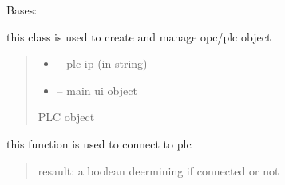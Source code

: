 \documentclass[letterpaper,10pt,english]{sphinxmanual}
\begin{document}
\begin{savenotes}\begin{fulllineitems}
\label{\detokenize{setting/backend/plc_managment:oxin.backend.plc_managment.management}}
\pysigstartsignatures
{}
\pysigstopsignatures
\sphinxAtStartPar
Bases: 

\sphinxAtStartPar
this class is used to create and manage opc/plc object
\begin{quote}\begin{description}
\begin{itemize}
\item {} 
\sphinxAtStartPar
{} – plc ip (in string)

\item {} 
\sphinxAtStartPar
{} – main ui object

\end{itemize}

\sphinxAtStartPar
PLC object

\end{description}\end{quote}

\begin{savenotes}\begin{fulllineitems}
\label{\detokenize{setting/backend/plc_managment:oxin.backend.plc_managment.management.connection}}
\pysigstartsignatures
{}
\pysigstopsignatures
\sphinxAtStartPar
this function is used to connect to plc
\begin{quote}\begin{description}
\sphinxAtStartPar
resault: a boolean deermining if connected or not

\end{description}\end{quote}

\end{fulllineitems}\end{savenotes}


\end{fulllineitems}
\end{savenotes}
\end{document}
